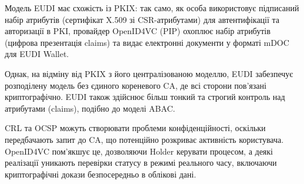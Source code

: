 Модель EUDI має схожість із PKIX: так само, як особа використовує підписаний набір атрибутів
(сертифікат X.509 зі CSR-атрибутами) для автентифікації та авторизації в PKI, провайдер
OpenID4VC (PIP) охоплює набір атрибутів (цифрова презентація claims) та видає електронні
документи у форматі mDOC для EUDI Wallet.

Однак, на відміну від PKIX з його централізованою моделлю, EUDI забезпечує розподілену модель
без єдиного кореневого CA, де всі сторони пов'язані криптографічно. EUDI також здійснює більш
тонкий та строгий контроль над атрибутами (claims), подібно до моделі ABAC.

CRL та OCSP можуть створювати проблеми конфіденційності, оскільки передбачають запит до CA, що
потенційно розкриває активність користувача. OpenID4VC пом'якшує це, дозволяючи Holder
керувати процесом, а деякі реалізації уникають перевірки статусу в режимі реального часу,
включаючи криптографічні докази безпосередньо в облікові дані.

